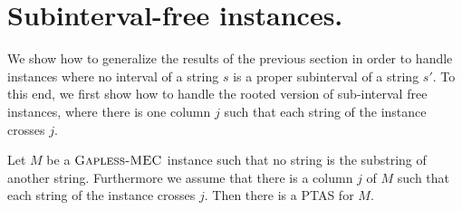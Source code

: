 \section{Subinterval-free instances.}\label{sec:subinterval-free}
We show how to generalize the results of the previous section in order to handle instances where no interval of a string $s$ is a proper subinterval of a string $s'$.
To this end, we first show how to handle the rooted version of sub-interval free instances, where there is one column $j$ such that each string of the instance crosses $j$.

\begin{lemma}\label{lem:second_instance_setting}
    Let $M$ be a $\textsc{Gapless-MEC}$ instance such that no string is the substring of another string.
    Furthermore we assume that there is a column $j$ of $M$ such that each string of the instance crosses $j$.
    Then there is a PTAS for $M$.
\end{lemma}
